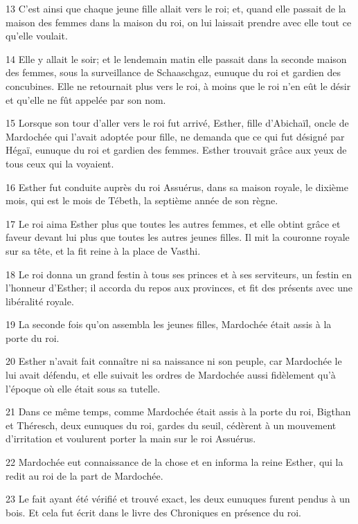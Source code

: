 \par 13 C'est ainsi que chaque jeune fille allait vers le roi; et, quand elle passait de la maison des femmes dans la maison du roi, on lui laissait prendre avec elle tout ce qu'elle voulait.
\par 14 Elle y allait le soir; et le lendemain matin elle passait dans la seconde maison des femmes, sous la surveillance de Schaaschgaz, eunuque du roi et gardien des concubines. Elle ne retournait plus vers le roi, à moins que le roi n'en eût le désir et qu'elle ne fût appelée par son nom.
\par 15 Lorsque son tour d'aller vers le roi fut arrivé, Esther, fille d'Abichaïl, oncle de Mardochée qui l'avait adoptée pour fille, ne demanda que ce qui fut désigné par Hégaï, eunuque du roi et gardien des femmes. Esther trouvait grâce aux yeux de tous ceux qui la voyaient.
\par 16 Esther fut conduite auprès du roi Assuérus, dans sa maison royale, le dixième mois, qui est le mois de Tébeth, la septième année de son règne.
\par 17 Le roi aima Esther plus que toutes les autres femmes, et elle obtint grâce et faveur devant lui plus que toutes les autres jeunes filles. Il mit la couronne royale sur sa tête, et la fit reine à la place de Vasthi.
\par 18 Le roi donna un grand festin à tous ses princes et à ses serviteurs, un festin en l'honneur d'Esther; il accorda du repos aux provinces, et fit des présents avec une libéralité royale.
\par 19 La seconde fois qu'on assembla les jeunes filles, Mardochée était assis à la porte du roi.
\par 20 Esther n'avait fait connaître ni sa naissance ni son peuple, car Mardochée le lui avait défendu, et elle suivait les ordres de Mardochée aussi fidèlement qu'à l'époque où elle était sous sa tutelle.
\par 21 Dans ce même temps, comme Mardochée était assis à la porte du roi, Bigthan et Théresch, deux eunuques du roi, gardes du seuil, cédèrent à un mouvement d'irritation et voulurent porter la main sur le roi Assuérus.
\par 22 Mardochée eut connaissance de la chose et en informa la reine Esther, qui la redit au roi de la part de Mardochée.
\par 23 Le fait ayant été vérifié et trouvé exact, les deux eunuques furent pendus à un bois. Et cela fut écrit dans le livre des Chroniques en présence du roi.

